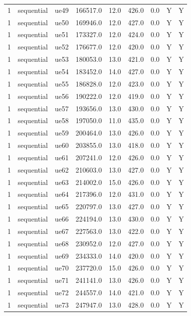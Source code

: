 \begin{table}[ht]
\begin{tabular}{|c|c|c|c|c|c|c|c|c|}
1 & sequential & ue49 & 166517.0 & 12.0 & 426.0 & 0.0 & Y & Y \\
1 & sequential & ue50 & 169946.0 & 12.0 & 427.0 & 0.0 & Y & Y \\
1 & sequential & ue51 & 173327.0 & 12.0 & 424.0 & 0.0 & Y & Y \\
1 & sequential & ue52 & 176677.0 & 12.0 & 420.0 & 0.0 & Y & Y \\
1 & sequential & ue53 & 180053.0 & 13.0 & 421.0 & 0.0 & Y & Y \\
1 & sequential & ue54 & 183452.0 & 14.0 & 427.0 & 0.0 & Y & Y \\
1 & sequential & ue55 & 186828.0 & 12.0 & 423.0 & 0.0 & Y & Y \\
1 & sequential & ue56 & 190222.0 & 12.0 & 419.0 & 0.0 & Y & Y \\
1 & sequential & ue57 & 193656.0 & 13.0 & 430.0 & 0.0 & Y & Y \\
1 & sequential & ue58 & 197050.0 & 11.0 & 435.0 & 0.0 & Y & Y \\
1 & sequential & ue59 & 200464.0 & 13.0 & 426.0 & 0.0 & Y & Y \\
1 & sequential & ue60 & 203855.0 & 13.0 & 418.0 & 0.0 & Y & Y \\
1 & sequential & ue61 & 207241.0 & 12.0 & 426.0 & 0.0 & Y & Y \\
1 & sequential & ue62 & 210603.0 & 13.0 & 427.0 & 0.0 & Y & Y \\
1 & sequential & ue63 & 214002.0 & 15.0 & 426.0 & 0.0 & Y & Y \\
1 & sequential & ue64 & 217396.0 & 12.0 & 431.0 & 0.0 & Y & Y \\
1 & sequential & ue65 & 220797.0 & 13.0 & 427.0 & 0.0 & Y & Y \\
1 & sequential & ue66 & 224194.0 & 13.0 & 430.0 & 0.0 & Y & Y \\
1 & sequential & ue67 & 227563.0 & 13.0 & 422.0 & 0.0 & Y & Y \\
1 & sequential & ue68 & 230952.0 & 12.0 & 427.0 & 0.0 & Y & Y \\
1 & sequential & ue69 & 234333.0 & 14.0 & 420.0 & 0.0 & Y & Y \\
1 & sequential & ue70 & 237720.0 & 15.0 & 426.0 & 0.0 & Y & Y \\
1 & sequential & ue71 & 241141.0 & 13.0 & 426.0 & 0.0 & Y & Y \\
1 & sequential & ue72 & 244557.0 & 14.0 & 421.0 & 0.0 & Y & Y \\
1 & sequential & ue73 & 247947.0 & 13.0 & 428.0 & 0.0 & Y & Y \\

\end{tabular}
\end{table}
